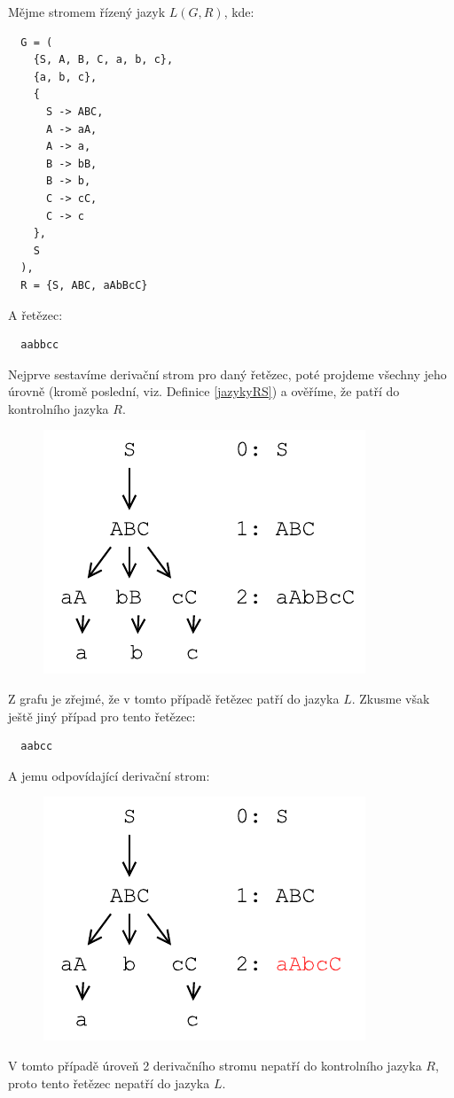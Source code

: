 \begin{exmp}
  Mějme stromem řízený jazyk $L(G, R)$, kde:
  \begin{lstlisting}
  G = (
    {S, A, B, C, a, b, c},
    {a, b, c},
    {
      S -> ABC,
      A -> aA,
      A -> a,
      B -> bB,
      B -> b,
      C -> cC,
      C -> c
    },
    S
  ),
  R = {S, ABC, aAbBcC}
  \end{lstlisting}
  \noindent
  A řetězec:

  \begin{lstlisting}
  aabbcc
  \end{lstlisting}

  \noindent
  Nejprve sestavíme derivační strom pro daný řetězec, poté projdeme všechny
  jeho úrovně (kromě poslední, viz. Definice \ref{jazykyRS}) a
  ověříme, že patří do kontrolního jazyka $R$.

  \begin{figure}[H]
    \centering
    \includegraphics{fig/TreeControlledGrammar1.pdf}
  \end{figure}

  \noindent
  Z grafu je zřejmé, že v tomto případě řetězec patří do jazyka $L$.
  Zkusme však ještě jiný případ pro tento řetězec:

  \begin{lstlisting}
  aabcc
  \end{lstlisting}

  \noindent
  A jemu odpovídající derivační strom:
  \begin{figure}[H]
    \centering
    \includegraphics{fig/TreeControlledGrammar2.pdf}
  \end{figure}

  \noindent
  V tomto případě úroveň 2 derivačního stromu nepatří do kontrolního jazyka $R$,
  proto tento řetězec nepatří do jazyka $L$.
\end{exmp}

